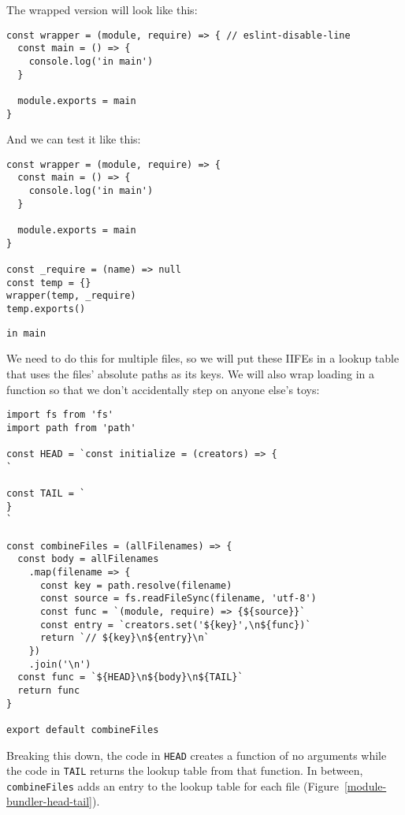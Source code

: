 \documentclass[krantzl]{krantz}
\newcommand{\figref}[1]{Figure~\ref{#1}}
\begin{document}
\noindent The wrapped version will look like this:


\begin{lstlisting}[frame=single,frameround=tttt]
const wrapper = (module, require) => { // eslint-disable-line
  const main = () => {
    console.log('in main')
  }

  module.exports = main
}
\end{lstlisting}



\noindent And we can test it like this:


\begin{lstlisting}[frame=single,frameround=tttt]
const wrapper = (module, require) => {
  const main = () => {
    console.log('in main')
  }

  module.exports = main
}

const _require = (name) => null
const temp = {}
wrapper(temp, _require)
temp.exports()
\end{lstlisting}



\begin{lstlisting}[frame=single,frameround=tttt]
in main
\end{lstlisting}



We need to do this for multiple files,
so we will put these IIFEs in a lookup table
that uses the files' absolute paths as its keys.
We will also wrap loading in a function
so that we don't accidentally step on anyone else's toys:


\begin{lstlisting}[frame=single,frameround=tttt]
import fs from 'fs'
import path from 'path'

const HEAD = `const initialize = (creators) => {
`

const TAIL = `
}
`

const combineFiles = (allFilenames) => {
  const body = allFilenames
    .map(filename => {
      const key = path.resolve(filename)
      const source = fs.readFileSync(filename, 'utf-8')
      const func = `(module, require) => {${source}}`
      const entry = `creators.set('${key}',\n${func})`
      return `// ${key}\n${entry}\n`
    })
    .join('\n')
  const func = `${HEAD}\n${body}\n${TAIL}`
  return func
}

export default combineFiles
\end{lstlisting}



Breaking this down,
the code in \texttt{HEAD} creates a function of no arguments
while the code in \texttt{TAIL} returns the lookup table from that function.
In between,
\texttt{combineFiles} adds an entry to the lookup table for each file
(\figref{module-bundler-head-tail}).
\end{document}
